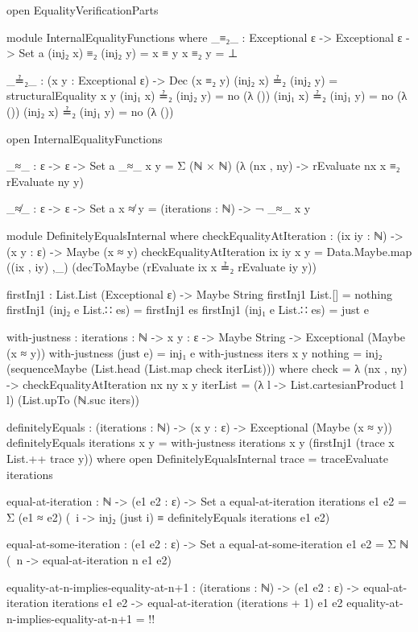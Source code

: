 \documentclass{report}
\begin{document}
\begin{code}
  open EqualityVerificationParts

  module InternalEqualityFunctions where
    _≡₂_ : Exceptional ε -> Exceptional ε -> Set a
    (inj₂ x) ≡₂ (inj₂ y) = x ≡ y
    x ≡₂ y = ⊥

    _≟₂_ : (x y : Exceptional ε) -> Dec (x ≡₂ y)
    (inj₂ x) ≟₂ (inj₂ y) = structuralEquality x y
    (inj₁ x) ≟₂ (inj₂ y) = no (λ ())
    (inj₁ x) ≟₂ (inj₁ y) = no (λ ())
    (inj₂ x) ≟₂ (inj₁ y) = no (λ ())

  open InternalEqualityFunctions

  _≈_ : ε -> ε -> Set a
  _≈_ x y = Σ (ℕ × ℕ) (λ (nx , ny) -> rEvaluate nx x ≡₂ rEvaluate ny y)

  _≉_ : ε -> ε -> Set a
  x ≉ y = (iterations : ℕ) -> ¬ _≈_ x y

  module DefinitelyEqualsInternal where
    checkEqualityAtIteration :
      (ix iy : ℕ) ->
      (x y : ε) ->
      Maybe (x ≈ y)
    checkEqualityAtIteration ix iy x y =
      Data.Maybe.map ((ix , iy) ,_) (decToMaybe (rEvaluate ix x ≟₂ rEvaluate iy y))

    firstInj1 : List.List (Exceptional ε) -> Maybe String
    firstInj1 List.[] = nothing
    firstInj1 (inj₂ e List.∷ es) = firstInj1 es
    firstInj1 (inj₁ e List.∷ es) = just e

    with-justness : {iterations : ℕ} ->
                    {x y : ε} ->
                    Maybe String ->
                    Exceptional (Maybe (x ≈ y))
    with-justness (just e) = inj₁ e
    with-justness {iters} {x} {y} nothing =
      inj₂ (sequenceMaybe (List.head (List.map check iterList)))
      where
      check = λ (nx , ny) -> checkEqualityAtIteration nx ny x y
      iterList = (λ l -> List.cartesianProduct l l) (List.upTo (ℕ.suc iters))

  definitelyEquals : (iterations : ℕ) ->
                     (x y : ε) ->
                     Exceptional (Maybe (x ≈ y))
  definitelyEquals iterations x y =
    with-justness {iterations} {x} {y} (firstInj1 (trace x List.++ trace y))
    where
    open DefinitelyEqualsInternal
    trace = traceEvaluate iterations

  equal-at-iteration : ℕ -> (e1 e2 : ε) -> Set a
  equal-at-iteration iterations e1 e2 =
    Σ (e1 ≈ e2)
      (\ i -> inj₂ (just i) ≡ definitelyEquals iterations e1 e2)

  equal-at-some-iteration : (e1 e2 : ε) -> Set a
  equal-at-some-iteration e1 e2 = Σ ℕ (\ n -> equal-at-iteration n e1 e2)

  equality-at-n-implies-equality-at-n+1 :
    (iterations : ℕ) ->
    (e1 e2 : ε) ->
    equal-at-iteration iterations e1 e2 ->
    equal-at-iteration (iterations + 1) e1 e2
  equality-at-n-implies-equality-at-n+1 = {!!}


\end{code}
\end{document}

